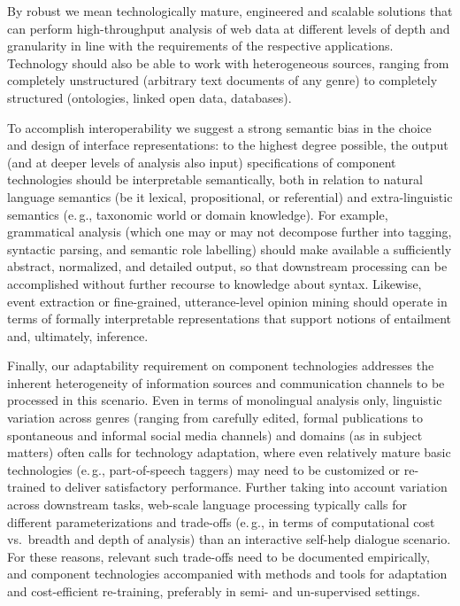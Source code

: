 \documentclass[10pt, plain]{../../metanetpaper}
\begin{document}
\begin{multicols}{2}
By robust we mean technologically mature, engineered and scalable solutions that can perform high-throughput analysis of web data at different levels of depth and granularity in line with the requirements of the respective applications. Technology should also be able to work with heterogeneous sources, ranging from completely unstructured (arbitrary text documents of any genre) to completely structured (ontologies, linked open data, databases).

To accomplish interoperability we suggest a strong semantic bias in the choice and design of interface representations: to the highest degree possible, the output (and at deeper levels of analysis also input) specifications of component technologies should be interpretable semantically, both in relation to natural language semantics (be it lexical, propositional, or referential) and extra-linguistic semantics (e.\,g., taxonomic world or domain knowledge). For example, grammatical analysis (which one may or may not decompose further into tagging, syntactic parsing, and semantic role labelling) should make available a sufficiently abstract, normalized, and detailed output, so that downstream processing can be accomplished without further recourse to knowledge about syntax. Likewise, event extraction or fine-grained, utterance-level opinion mining should operate in terms of formally interpretable representations that support notions of entailment and, ultimately, inference.

Finally, our adaptability requirement on component technologies addresses the inherent heterogeneity of information sources and communication channels to be processed in this scenario.  Even in terms of monolingual analysis only, linguistic variation across genres (ranging from carefully edited, formal publications to spontaneous and informal social media channels) and domains (as in subject matters) often calls for technology adaptation, where even relatively mature basic technologies (e.\,g., part-of-speech taggers) may need to be customized or re-trained to deliver satisfactory performance. Further taking into account variation across downstream tasks, web-scale language processing typically calls for different parameterizations and trade-offs (e.\,g., in terms of computational cost vs.~breadth and depth of analysis) than an interactive self-help dialogue scenario. For these reasons, relevant such trade-offs need to be documented empirically, and component technologies accompanied with methods and tools for adaptation and cost-efficient re-training, preferably in semi- and un-supervised settings.
 

\end{multicols}
\end{document}
